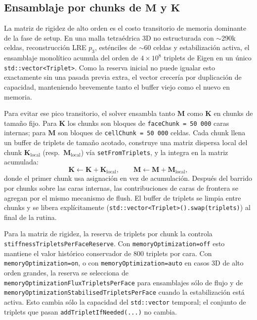 \documentclass[11pt,a4paper]{article}
\newcommand{\code}[1]{\texttt{\small #1}}
\newcommand{\Mmass}{\mathbf{M}}
\newcommand{\Kstif}{\mathbf{K}}
\begin{document}
\subsection{Ensamblaje por chunks de \texorpdfstring{$\Mmass$}{M} y
\texorpdfstring{$\Kstif$}{K}}
\label{sec:chunked-assembly}

La matriz de rigidez de alto orden es el costo transitorio de memoria dominante de la fase de
setup. En una malla tetraédrica 3D no estructurada con $\sim$290k celdas, reconstrucción LRE
$p_3$, esténciles de $\sim$60 celdas y estabilización activa, el ensamblaje monolítico
acumula del orden de $4\times 10^8$ triplets de Eigen en un único
\code{std::vector<Triplet>}. Como la reserva inicial no puede igualar esto exactamente sin una
pasada previa extra, el vector crecería por duplicación de capacidad, manteniendo brevemente
tanto el buffer viejo como el nuevo en memoria.

Para evitar ese pico transitorio, el solver ensambla tanto $\Mmass$ como $\Kstif$ en chunks
de tamaño fijo. Para $\Kstif$ los chunks son bloques de \code{faceChunk = 50\,000} caras
internas; para $\Mmass$ son bloques de \code{cellChunk = 50\,000} celdas. Cada chunk llena un
buffer de triplets de tamaño acotado, construye una matriz dispersa local del chunk
$\Kstif_{\mathrm{local}}$ (resp.\ $\Mmass_{\mathrm{local}}$) vía \code{setFromTriplets}, y la
integra en la matriz acumulada:
\begin{equation}
  \Kstif \leftarrow \Kstif + \Kstif_{\mathrm{local}},
  \qquad
  \Mmass \leftarrow \Mmass + \Mmass_{\mathrm{local}},
  \label{eq:chunk-fold}
\end{equation}
donde el primer chunk usa asignación en vez de acumulación. Después del barrido por chunks
sobre las caras internas, las contribuciones de caras de frontera se agregan por el mismo
mecanismo de flush. El buffer de triplets se limpia entre chunks y se libera explícitamente
(\code{std::vector<Triplet>().swap(triplets)}) al final de la rutina.

Para la matriz de rigidez, la reserva de triplets por chunk la controla
\code{stiffnessTripletsPerFaceReserve}. Con \code{memoryOptimization=off} esto mantiene el
valor histórico conservador de 800 triplets por cara. Con \code{memoryOptimization=on}, o con
\code{memoryOptimization=auto} en casos 3D de alto orden grandes, la reserva se selecciona de
\code{memoryOptimizationFluxTripletsPerFace} para ensamblajes sólo de flujo y de
\code{memoryOptimizationStabilisedTripletsPerFace} cuando la estabilización está activa. Esto
cambia sólo la capacidad del \code{std::vector} temporal; el conjunto de triplets que pasan
\code{addTripletIfNeeded(...)} no cambia.
\end{document}
